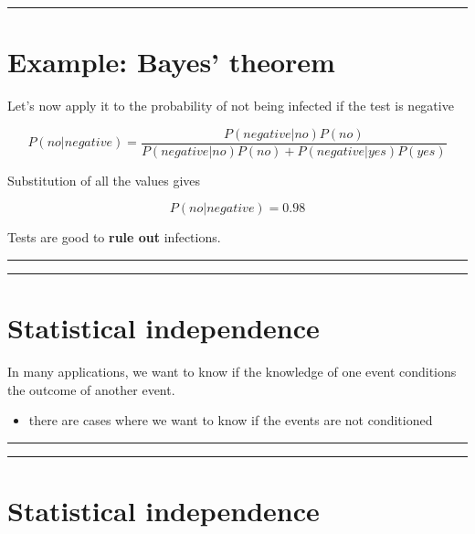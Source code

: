 \documentclass[
]{book}
\providecommand{\tightlist}{%
  \setlength{\itemsep}{0pt}\setlength{\parskip}{0pt}}
\begin{document}
\begin{center}\rule{0.5\linewidth}{0.5pt}\end{center}

\hypertarget{example-bayes-theorem-1}{%
\section{Example: Bayes' theorem}\label{example-bayes-theorem-1}}

Let's now apply it to the probability of not being infected if the test is negative

\[P(no|negative)  = \frac{P(negative|no)  P(no)}{P(negative|no) P(no)+P(negative|yes)P(yes)}\]

Substitution of all the values gives

\[P(no|negative)=0.98\]

Tests are good to \textbf{rule out} infections.

\begin{center}\rule{0.5\linewidth}{0.5pt}\end{center}

\begin{center}\rule{0.5\linewidth}{0.5pt}\end{center}

\hypertarget{statistical-independence}{%
\section{Statistical independence}\label{statistical-independence}}

In many applications, we want to know if the knowledge of one event conditions the outcome of another event.

\begin{itemize}
\tightlist
\item
  there are cases where we want to know if the events are not conditioned
\end{itemize}

\begin{center}\rule{0.5\linewidth}{0.5pt}\end{center}

\begin{center}\rule{0.5\linewidth}{0.5pt}\end{center}

\hypertarget{statistical-independence-1}{%
\section{Statistical independence}\label{statistical-independence-1}}
\end{document}

